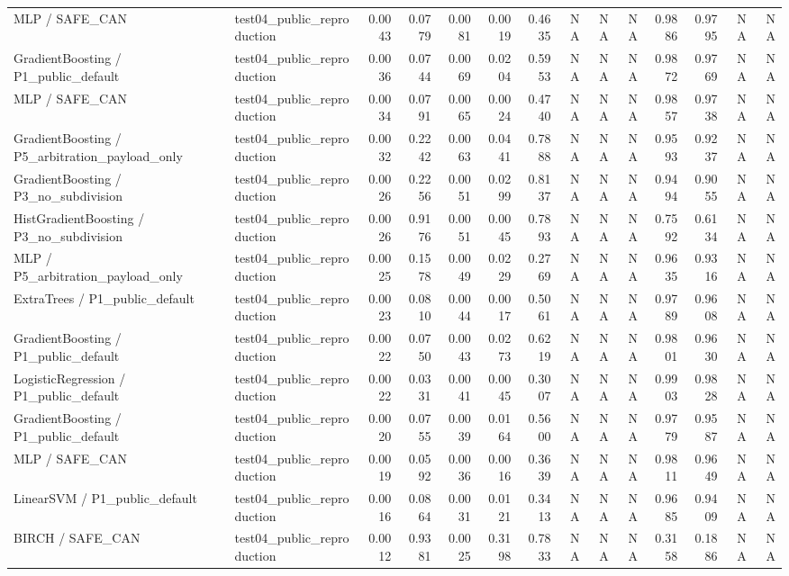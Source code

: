 \begin{tabular}{llrrrrrrrrrrrr}
MLP / SAFE\_CAN & test04\_public\_reproduction & 0.0043 & 0.0779 & 0.0081 & 0.0019 & 0.4635 & NA & NA & NA & 0.9886 & 0.9795 & NA & NA \\
GradientBoosting / P1\_public\_default & test04\_public\_reproduction & 0.0036 & 0.0744 & 0.0069 & 0.0204 & 0.5953 & NA & NA & NA & 0.9872 & 0.9769 & NA & NA \\
MLP / SAFE\_CAN & test04\_public\_reproduction & 0.0034 & 0.0791 & 0.0065 & 0.0024 & 0.4740 & NA & NA & NA & 0.9857 & 0.9738 & NA & NA \\
GradientBoosting / P5\_arbitration\_payload\_only & test04\_public\_reproduction & 0.0032 & 0.2242 & 0.0063 & 0.0441 & 0.7888 & NA & NA & NA & 0.9593 & 0.9237 & NA & NA \\
GradientBoosting / P3\_no\_subdivision & test04\_public\_reproduction & 0.0026 & 0.2256 & 0.0051 & 0.0299 & 0.8137 & NA & NA & NA & 0.9494 & 0.9055 & NA & NA \\
HistGradientBoosting / P3\_no\_subdivision & test04\_public\_reproduction & 0.0026 & 0.9176 & 0.0051 & 0.0045 & 0.7893 & NA & NA & NA & 0.7592 & 0.6134 & NA & NA \\
MLP / P5\_arbitration\_payload\_only & test04\_public\_reproduction & 0.0025 & 0.1578 & 0.0049 & 0.0229 & 0.2769 & NA & NA & NA & 0.9635 & 0.9316 & NA & NA \\
ExtraTrees / P1\_public\_default & test04\_public\_reproduction & 0.0023 & 0.0810 & 0.0044 & 0.0017 & 0.5061 & NA & NA & NA & 0.9789 & 0.9608 & NA & NA \\
GradientBoosting / P1\_public\_default & test04\_public\_reproduction & 0.0022 & 0.0750 & 0.0043 & 0.0273 & 0.6219 & NA & NA & NA & 0.9801 & 0.9630 & NA & NA \\
LogisticRegression / P1\_public\_default & test04\_public\_reproduction & 0.0022 & 0.0331 & 0.0041 & 0.0045 & 0.3007 & NA & NA & NA & 0.9903 & 0.9828 & NA & NA \\
GradientBoosting / P1\_public\_default & test04\_public\_reproduction & 0.0020 & 0.0755 & 0.0039 & 0.0164 & 0.5600 & NA & NA & NA & 0.9779 & 0.9587 & NA & NA \\
MLP / SAFE\_CAN & test04\_public\_reproduction & 0.0019 & 0.0592 & 0.0036 & 0.0016 & 0.3639 & NA & NA & NA & 0.9811 & 0.9649 & NA & NA \\
LinearSVM / P1\_public\_default & test04\_public\_reproduction & 0.0016 & 0.0864 & 0.0031 & 0.0121 & 0.3413 & NA & NA & NA & 0.9685 & 0.9409 & NA & NA \\
BIRCH / SAFE\_CAN & test04\_public\_reproduction & 0.0012 & 0.9381 & 0.0025 & 0.3198 & 0.7833 & NA & NA & NA & 0.3158 & 0.1886 & NA & NA \\

\end{tabular}
